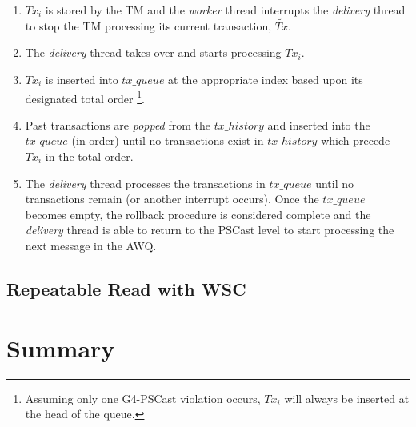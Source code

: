     \begin{enumerate}
        \item    $Tx_i$ is stored by the TM and the \emph{worker} thread interrupts the \emph{delivery} thread to stop the TM processing its current transaction, $\tilde{Tx}$.  
        
        \item    The \emph{delivery} thread takes over and starts processing $Tx_i$.
        
         \item    $Tx_i$ is inserted into $tx\_queue$ at the appropriate index based upon its designated total order \footnote{Assuming only one G4-PSCast violation occurs, $Tx_i$ will always be inserted at the head of the queue.}.
        
        \item    Past transactions are \emph{popped} from the $tx\_history$ and inserted into the $tx\_queue$ (in order) until no transactions exist in $tx\_history$ which precede $Tx_i$ in the total order.
        
        \item    The \emph{delivery} thread processes the transactions in $tx\_queue$ until no transactions remain (or another interrupt occurs).  Once the $tx\_queue$ becomes empty, the rollback procedure is considered complete and the \emph{delivery} thread is able to return to the \textsf{PSCast} level to start processing the next message in the AWQ.  
    \end{enumerate}        
    
    \subsection{Repeatable Read with WSC}
    
        

\section{Summary}
    
